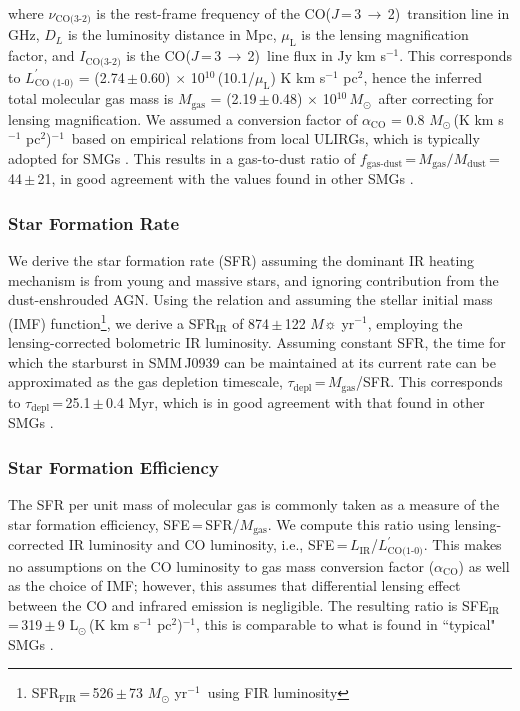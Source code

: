 \documentclass[twocolumn,apj,numberedappendix]{emulateapj}
\newcommand{\Msun}{\mbox{$M_{\odot}$}}
\newcommand{\Lsun}{\mbox{L$_{\odot}$}}
\newcommand{\CO}{\mbox{CO($J$\,=\,3\,$\rightarrow$\,2) }}
\newcommand{\Lp}{\mbox{$L^{\prime}_\textrm{CO(1-0)}$}}
\newcommand{\LpU}{\mbox{K\,\,km\,\,s$^{-1}$\,\,pc$^2$}}
\newcommand{\eg}{{\sl e.g.,~}}
\newcommand{\pmOne}{\mbox{$^{-1}$}}
\begin{document}
where $\nu_\textrm{CO(3-2)}$ is the rest-frame frequency of the \CO transition line in GHz, $D_L$ is the luminosity distance in Mpc, $\mu_\textrm{L}$ is the lensing magnification factor, and $I_\textrm{CO(3-2)}$ is the \CO line flux in Jy\,\,km\,\,s\pmOne. This corresponds to $L^{\prime}_\textrm{CO (1-0)}$ = (2.74\,$\pm$\,0.60) $\times$\,\,10$^{10}$\,(10.1/$\mu_\textrm{L}$)\,\,\LpU, hence
the inferred total molecular gas mass is $M_\textrm{gas}$ = (2.19\,$\pm$\,0.48) $\times$\,\,10$^{10}$\,\Msun\, after correcting for lensing magnification. We assumed a conversion factor of $\alpha_\textrm{CO}$ = 0.8\,\,\Msun\,(\LpU)\pmOne\ based on empirical relations from local ULIRGs, which is typically
adopted for SMGs \citep[\eg][]{Tacconi06a,Tacconi08a,Bothwell13a}. 
This results in a gas-to-dust
ratio of $f_\textrm{gas-dust}$\,=\,$M_\textrm{gas}/M_\textrm{dust}$\,=\,44\,$\pm$\,21, in good agreement with the 
values found in other SMGs \citep{Coppin08a,Micha10a,Riechers11c}.

\subsubsection{Star Formation Rate}
We derive the star formation rate (SFR) assuming the dominant IR heating mechanism is from young and massive stars, and ignoring contribution from the 
dust-enshrouded AGN. 
Using the \citet{Kennicutt98a} relation and assuming the \citet{Chabrier03a}
stellar initial mass (IMF) function\footnote{SFR$_\textrm{FIR}$\,=\,526\,$\pm$\,73 $M_
\odot$ yr\pmOne\ using FIR luminosity},
we derive a SFR$_\textrm{IR}$ of 874\,$\pm$\,122 $M\sun$\,\,yr\pmOne, employing the lensing-corrected bolometric IR luminosity.
Assuming constant SFR, the time for which the starburst in SMM\,J0939 can be maintained at its
current rate can be approximated as the gas depletion timescale, $\tau_\textrm{depl}$\,=\,$M_\textrm{gas}$/SFR. 
This corresponds to $\tau_\textrm{depl}$\,=\,25.1\,$\pm$\,0.4 Myr, which is in good agreement with that found in other SMGs \citep[\eg][]{Greve05a}. 

\subsubsection{Star Formation Efficiency}
The SFR per unit mass of molecular gas is commonly taken as a
measure of the star formation efficiency, SFE\,=\,SFR/$M_\textrm{gas}$. We compute this ratio using lensing-corrected IR 
luminosity and CO luminosity, i.e., SFE\,=\,$L_\textrm{IR}$/\Lp. This makes no assumptions on the CO luminosity to gas mass conversion factor ($\alpha_\textrm{CO}$) as well as the 
choice of IMF; however, this assumes that differential lensing effect between the CO and infrared emission is negligible. 
The resulting ratio is SFE$_\textrm{IR}$\,=\,319\,$\pm$\,9\,\,\Lsun\,(\LpU)$^{-1}$, this is comparable
to what is found in ``typical" SMGs \citep{Greve05a,Tacconi06a,Riechers11c}.
\end{document}
